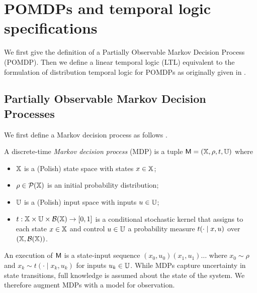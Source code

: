 \documentclass{ifacconf}
\newcommand{\cristi}[1]{{\color{orange}#1}}
\begin{document}
\section{POMDPs and temporal logic specifications}

We first give the definition of a Partially Observable Markov Decision Process (POMDP). Then we define a linear temporal logic (LTL) equivalent to the formulation of distribution temporal logic for POMDPs as originally given in \citep{JonesDTL2013}.

\subsection{Partially Observable Markov  Decision Processes}

We first define a Markov decision process as follows \citep{hll1996}.
\begin{definition}
\label{def:MDP}
  A discrete-time \emph{Markov decision process} (MDP) is a tuple $\mathsf{M} = ({\mathbb{X}}, \rho, t, {\mathbb{U}})$ where
  \begin{itemize}
    \item ${\mathbb{X}}$ is a (Polish) state space with states $x\in{\mathbb{X}}$; %
    \item $\rho \in \mathcal P({\mathbb{X}})$ is an initial probability distribution;
    \item ${\mathbb{U}}$ is a (Polish) input space with inputs $u\in{\mathbb{U}}$;
    \item $t:{\mathbb{X}}\times{\mathbb{U}}\times\mathcal B({\mathbb{X}})\rightarrow[0,1]$ is a conditional stochastic kernel that assigns to each state $x\in {\mathbb{X}}$ and control $u\in {\mathbb{U}}$ a probability measure $t(\cdot\mid x,u)$ over $({\mathbb{X}},\mathcal B({\mathbb{X}}))$.
  \end{itemize}
\end{definition}

An execution of $\mathsf{M}$ is a state-input sequence $(x_0, u_0)(x_1, u_1)\ldots$ where $x_0 \sim \rho$ and $x_k \sim t(\cdot \mid x_k, u_k)$ for inputs $u_k \in {\mathbb{U}}$. While MDPs capture uncertainty in state transitions, full knowledge is assumed about the state of the system. We therefore augment MDPs with a model for observation.

\end{document}
